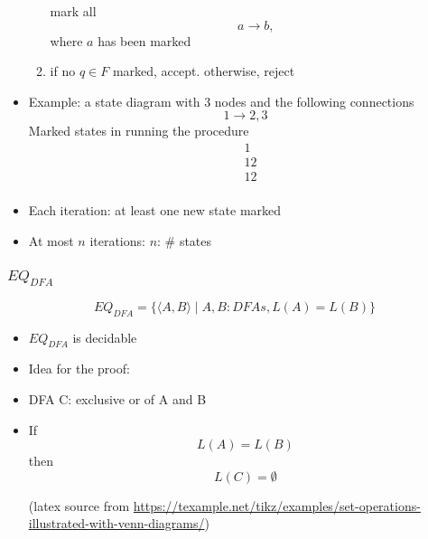 \begin{frame}[allowframebreaks]
\begin{itemize}
\begin{enumerate}
\qquad mark all 
\begin{equation*}
  a\rightarrow b,
\end{equation*}
\qquad where $a$ has been marked
\item if no $q\in F$ marked, accept.
otherwise, reject
  \end{enumerate}
\item Example: a state diagram with 3 nodes and the following connections
  \begin{equation*}
    1\rightarrow 2, 3
  \end{equation*}
  Marked states in running the procedure
  \begin{equation*}
    \begin{split}
& 1  \\
& 1 2\\
& 1 2\\
\end{split}
\end{equation*}
\item Each iteration: at least one new state marked
\item At most $n$ iterations: $n$: \# states
\end{itemize}\end{frame} \begin{frame}[allowframebreaks] \frametitle{$EQ_{DFA}$}
\begin{equation*}
  EQ_{DFA}
=\{\langle  A,B\rangle \mid A, B: DFAs, 
L(A)=L(B)\}
\end{equation*}
  \begin{itemize}
\item $EQ_{DFA}$ is decidable
\item Idea for the proof:

\item [] DFA C: exclusive or of A and B

\item [] If
  \begin{equation*}
  L(A)=L(B)
\end{equation*}
then
\begin{equation*}
  L(C)=\emptyset
\end{equation*}

\begin{center}
\end{center}
{\small (latex source from
\url{https://texample.net/tikz/examples/set-operations-illustrated-with-venn-diagrams/})}


\end{itemize}
\end{frame}
